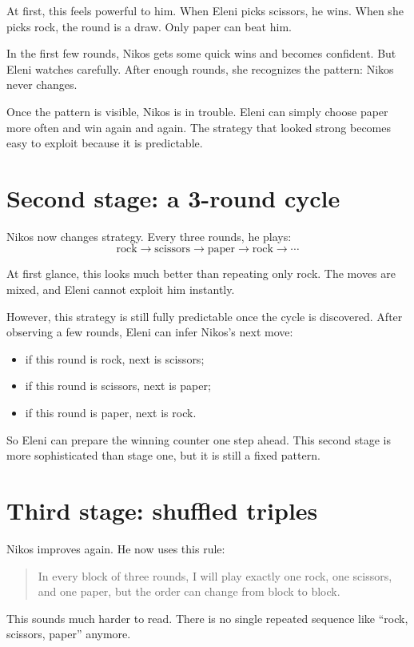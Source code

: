 At first, this feels powerful to him. When Eleni picks scissors, he wins. When
she picks rock, the round is a draw. Only paper can beat him.

In the first few rounds, Nikos gets some quick wins and becomes confident. But
Eleni watches carefully. After enough rounds, she recognizes the pattern:
Nikos never changes.

Once the pattern is visible, Nikos is in trouble. Eleni can simply choose paper
more often and win again and again. The strategy that looked strong becomes easy
to exploit because it is predictable.

\section{Second stage: a 3-round cycle}
Nikos now changes strategy. Every three rounds, he plays:
\[
\text{rock} \rightarrow \text{scissors} \rightarrow \text{paper} \rightarrow \text{rock} \rightarrow \cdots
\]

At first glance, this looks much better than repeating only rock. The moves are
mixed, and Eleni cannot exploit him instantly.

However, this strategy is still fully predictable once the cycle is discovered.
After observing a few rounds, Eleni can infer Nikos's next move:
\begin{itemize}
  \item if this round is rock, next is scissors;
  \item if this round is scissors, next is paper;
  \item if this round is paper, next is rock.
\end{itemize}

So Eleni can prepare the winning counter one step ahead. This second stage is
more sophisticated than stage one, but it is still a fixed pattern.

\section{Third stage: shuffled triples}
Nikos improves again. He now uses this rule:
\begin{quote}
In every block of three rounds, I will play exactly one rock, one scissors, and
one paper, but the order can change from block to block.
\end{quote}

This sounds much harder to read. There is no single repeated sequence like
``rock, scissors, paper'' anymore.


